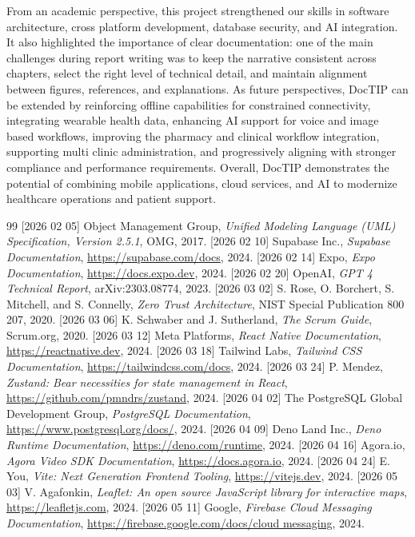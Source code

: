 \documentclass[12pt,a4paper,oneside]{report}
\begin{document}
From an academic perspective, this project strengthened our skills in software architecture, cross platform development, database security, and AI integration. It also highlighted the importance of clear documentation: one of the main challenges during report writing was to keep the narrative consistent across chapters, select the right level of technical detail, and maintain alignment between figures, references, and explanations. As future perspectives, DocTIP can be extended by reinforcing offline capabilities for constrained connectivity, integrating wearable health data, enhancing AI support for voice and image based workflows, improving the pharmacy and clinical workflow integration, supporting multi clinic administration, and progressively aligning with stronger compliance and performance requirements. Overall, DocTIP demonstrates the potential of combining mobile applications, cloud services, and AI to modernize healthcare operations and patient support.

\clearpage
{}
{}
{\small
\begin{thebibliography}{99}
\setlength\itemsep{3pt}
 [2026 02 05] Object Management Group, \textit{Unified Modeling Language (UML) Specification, Version 2.5.1}, OMG, 2017.
 [2026 02 10] Supabase Inc., \textit{Supabase Documentation}, \url{https://supabase.com/docs}, 2024.
 [2026 02 14] Expo, \textit{Expo Documentation}, \url{https://docs.expo.dev}, 2024.
 [2026 02 20] OpenAI, \textit{GPT 4 Technical Report}, arXiv:2303.08774, 2023.
 [2026 03 02] S. Rose, O. Borchert, S. Mitchell, and S. Connelly, \textit{Zero Trust Architecture}, NIST Special Publication 800 207, 2020.
 [2026 03 06] K. Schwaber and J. Sutherland, \textit{The Scrum Guide}, Scrum.org, 2020.
 [2026 03 12] Meta Platforms, \textit{React Native Documentation}, \url{https://reactnative.dev}, 2024.
 [2026 03 18] Tailwind Labs, \textit{Tailwind CSS Documentation}, \url{https://tailwindcss.com/docs}, 2024.
 [2026 03 24] P. Mendez, \textit{Zustand: Bear necessities for state management in React}, \url{https://github.com/pmndrs/zustand}, 2024.
 [2026 04 02] The PostgreSQL Global Development Group, \textit{PostgreSQL Documentation}, \url{https://www.postgresql.org/docs/}, 2024.
 [2026 04 09] Deno Land Inc., \textit{Deno Runtime Documentation}, \url{https://deno.com/runtime}, 2024.
 [2026 04 16] Agora.io, \textit{Agora Video SDK Documentation}, \url{https://docs.agora.io}, 2024.
 [2026 04 24] E. You, \textit{Vite: Next Generation Frontend Tooling}, \url{https://vitejs.dev}, 2024.
 [2026 05 03] V. Agafonkin, \textit{Leaflet: An open source JavaScript library for interactive maps}, \url{https://leafletjs.com}, 2024.
 [2026 05 11] Google, \textit{Firebase Cloud Messaging Documentation}, \url{https://firebase.google.com/docs/cloud messaging}, 2024.
\end{thebibliography}
}
\end{document}
